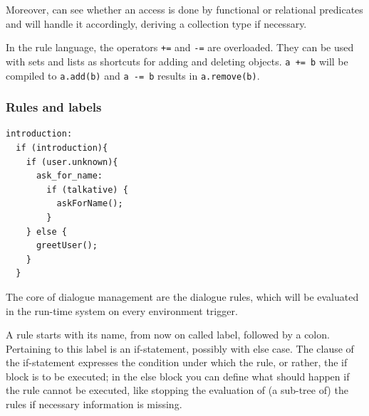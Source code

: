 %
Moreover, \vonda can see whether an access is done by functional or relational predicates and will handle it accordingly, deriving a collection type if necessary.


In the rule language, the operators \texttt{+=} and \texttt{-=} are overloaded. They can be used with sets and lists as shortcuts for adding and deleting objects. \texttt{a += b} will be compiled to \texttt{a.add(b)} and \texttt{a -= b} results in \texttt{a.remove(b)}.

\subsubsection{Rules and labels}

\begin{small}
\begin{verbatim}
introduction:
  if (introduction){
    if (user.unknown){
      ask_for_name:
        if (talkative) {
          askForName();
        }
    } else {
      greetUser();
    }
  }
\end{verbatim}
\end{small}

%
The core of \vonda dialogue management are the dialogue rules, which will be evaluated in the run-time system on every environment trigger.

A rule starts with its name, from now on called label, followed by a colon. Pertaining to this label is an if-statement, possibly with else case. The clause of the if-statement expresses the condition under which the rule, or rather, the if block is to be executed; in the else block you can define what should happen if the rule cannot be executed, like stopping the evaluation of (a sub-tree of) the rules if necessary information is missing.

